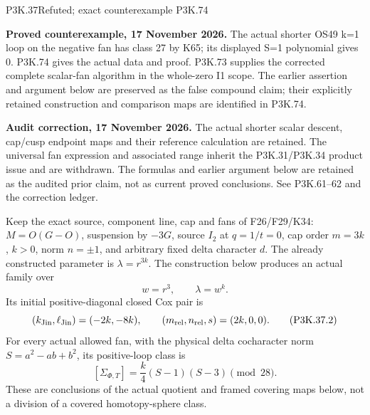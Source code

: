 \begin{statement}{P3K.37}{Refuted; exact counterexample P3K.74}
\par\noindent\textbf{Proved counterexample, 17 November 2026.} The actual shorter OS49 k=1 loop on the negative fan has class 27 by K65; its displayed S=1 polynomial gives 0. P3K.74 gives the actual data and proof. P3K.73 supplies the corrected complete scalar-fan algorithm in the whole-zero I1 scope. The earlier assertion and argument below are preserved as the false compound claim; their explicitly retained construction and comparison maps are identified in P3K.74.

\par\noindent\textbf{Audit correction, 17 November 2026.} The actual shorter scalar descent, cap/cusp endpoint maps and their reference calculation are retained. The universal fan expression and associated range inherit the P3K.31/P3K.34 product issue and are withdrawn. The formulas and earlier argument below are retained as the audited prior claim, not as current proved conclusions. See P3K.61--62 and the correction ledger.
\medskip

Keep the exact source, component line, cap and fans of F26/F29/K34:
\(M=O(G-O)\), suspension by \(-3G\), source \(I_2\) at
\(q=1/t=0\), cap order \(m=3k\), \(k>0\), norm
\(n=\pm1\), and arbitrary fixed delta character \(d\).
The already constructed parameter is \(\lambda=r^{3k}\).
The construction below produces an actual family over
\[
 w=r^3,\qquad \lambda=w^k.                                      \tag{P3K.37.1}
\]
Its initial positive-diagonal closed Cox pair is
\[
 (k_{\rm Jin},\ell_{\rm Jin})=(-2k,-8k),\qquad
 (m_{\rm rel},n_{\rm rel},s)=(2k,0,0).
                                                                    \tag{P3K.37.2}
\]
For every actual allowed fan, with the physical delta cocharacter norm
\(S=a^2-ab+b^2\), its positive-loop class is
\[
 [\Sigma_{\Phi,T}]=\frac{k}{4}(S-1)(S-3)\pmod {28}.              \tag{P3K.37.3}
\]
These are conclusions of the actual quotient and framed covering maps below,
not a division of a covered homotopy-sphere class.
\end{statement}
